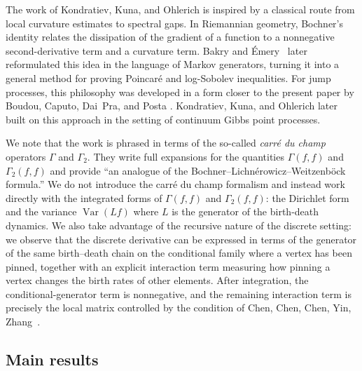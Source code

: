 \documentclass[10pt]{amsart}
\newcommand{\Var}{{\operatorname{Var}}}
\begin{document}
	
	
	
	The work of Kondratiev, Kuna, and Ohlerich is inspired by a classical route from local curvature estimates to spectral gaps.
	In Riemannian geometry, Bochner's identity relates the dissipation of the
	gradient of a function to a nonnegative second-derivative term and a curvature
	term.  Bakry and \'Emery~\cite{bakry2006diffusions} later reformulated this idea in the language of
	Markov generators, turning it into a general method for proving Poincar\'e and
	log-Sobolev inequalities.  For jump processes, this philosophy was developed in a form closer to the
	present paper by Boudou, Caputo, Dai~Pra, and Posta
	\cite{boudou2006spectral}.  Kondratiev, Kuna, and Ohlerich
	\cite{kondratiev2013spectral} later built on this approach in the setting of continuum
	Gibbs point processes.  
	
	We note that the work \cite{kondratiev2013spectral} is phrased in terms of the so-called \emph{carr\'e du champ} operators $\Gamma$ and $\Gamma_2$.  They write full expansions for the quantities $\Gamma(f,f)$ and $\Gamma_2(f,f)$ and provide ``an analogue of the Bochner--Lichn\'erowicz--Weitzenb\"ock formula.'' 
	We do not introduce the carr\'{e} du champ formalism and instead work directly with the integrated forms of $\Gamma(f,f)$ and $\Gamma_2(f,f)$: the
	Dirichlet form and the variance $\Var(Lf)$ where $L$ is the generator of the birth-death dynamics. 
	We also take advantage of the recursive nature of the discrete setting: we observe that the discrete derivative can be expressed in terms of the generator of the same birth--death chain on the conditional family where a vertex has been pinned, together with an explicit interaction term measuring how pinning a vertex changes the birth rates of other elements. After integration, the conditional-generator term is nonnegative, and the remaining interaction term is precisely the local matrix controlled by the condition of Chen, Chen, Chen, Yin, Zhang~\cite{chen2025rapid}.
	
	
	
	\subsection*{Main results}
	
	
	
\end{document}
